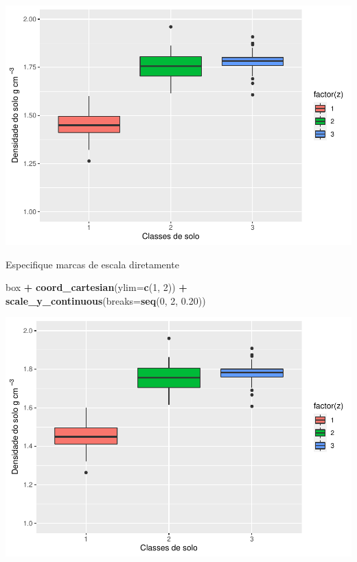 \documentclass[
]{book}
\newenvironment{Shaded}{\begin{snugshade}}{\end{snugshade}}
\newcommand{\DataTypeTok}[1]{\textcolor[rgb]{0.13,0.29,0.53}{#1}}
\newcommand{\DecValTok}[1]{\textcolor[rgb]{0.00,0.00,0.81}{#1}}
\newcommand{\FloatTok}[1]{\textcolor[rgb]{0.00,0.00,0.81}{#1}}
\newcommand{\KeywordTok}[1]{\textcolor[rgb]{0.13,0.29,0.53}{\textbf{#1}}}
\newcommand{\NormalTok}[1]{#1}
\newcommand{\OperatorTok}[1]{\textcolor[rgb]{0.81,0.36,0.00}{\textbf{#1}}}
\newcommand{\StringTok}[1]{\textcolor[rgb]{0.31,0.60,0.02}{#1}}
\begin{document}
\includegraphics{TudodoR_files/figure-latex/unnamed-chunk-204-1.pdf}

Especifique marcas de escala diretamente

\begin{Shaded}
\begin{Highlighting}[]
\NormalTok{box }\OperatorTok{+}\StringTok{ }\KeywordTok{coord_cartesian}\NormalTok{(}\DataTypeTok{ylim=}\KeywordTok{c}\NormalTok{(}\DecValTok{1}\NormalTok{, }\DecValTok{2}\NormalTok{)) }\OperatorTok{+}\StringTok{ }
\StringTok{    }\KeywordTok{scale_y_continuous}\NormalTok{(}\DataTypeTok{breaks=}\KeywordTok{seq}\NormalTok{(}\DecValTok{0}\NormalTok{, }\DecValTok{2}\NormalTok{, }\FloatTok{0.20}\NormalTok{))  }
\end{Highlighting}
\end{Shaded}

\includegraphics{TudodoR_files/figure-latex/unnamed-chunk-205-1.pdf}
\end{document}
